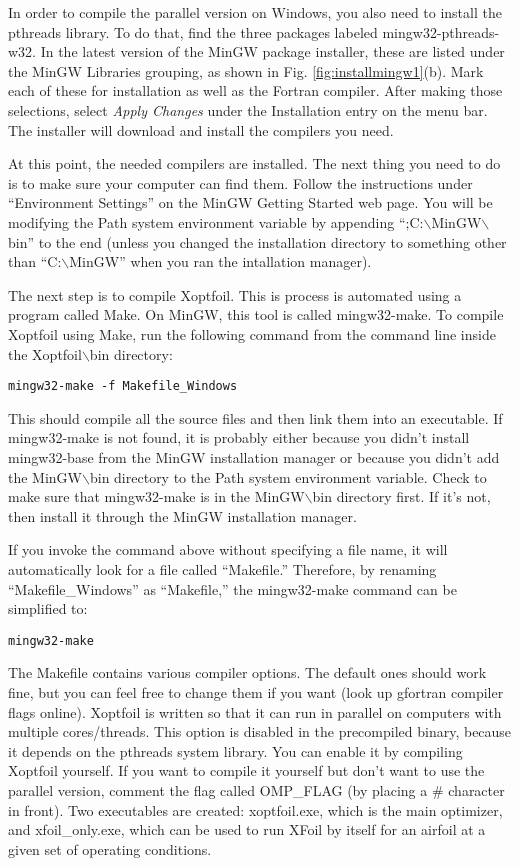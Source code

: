 \documentclass[11pt]{article}
\begin{document}
In order to compile the parallel version on Windows, you also need to install the pthreads
library.  To do that, find the three packages labeled mingw32-pthreads-w32.  In the latest
version of the MinGW package installer, these are listed under the MinGW Libraries
grouping, as shown in Fig. \ref{fig:installmingw1}(b).  Mark each of these for
installation as well as the Fortran compiler. After making those selections, select
\textit{Apply Changes} under the Installation entry on the menu bar.  The installer will 
download and install the compilers you need.

At this point, the needed compilers are installed.  The next thing you need to do is to
make sure your computer can find them.  Follow the instructions under ``Environment
Settings'' on the MinGW Getting Started web page.  You will be modifying the Path
system environment variable by appending ``;C:$\backslash$MinGW$\backslash$bin''
to the end (unless you changed the installation directory to something other than
``C:$\backslash$MinGW'' when you ran the intallation manager).

The next step is to compile Xoptfoil. This is process is automated using a program called
Make.  On MinGW, this tool is called mingw32-make.  To compile Xoptfoil using Make, run the
following command from the command line inside the Xoptfoil$\backslash$bin directory:

\begin{verbatim}
mingw32-make -f Makefile_Windows
\end{verbatim}

This should compile all the source files and then link them into an executable.  If
mingw32-make is not found, it is probably either because you didn't install mingw32-base
from the MinGW installation manager or because you didn't add the MinGW$\backslash$bin
directory to the Path system environment variable.  Check to make sure that mingw32-make
is in the MinGW$\backslash$bin directory first.  If it's not, then install it through the
MinGW installation manager.

If you invoke the command above without specifying a file name, it will automatically look
for a file called ``Makefile.''  Therefore, by renaming ``Makefile\_Windows'' as
``Makefile,'' the mingw32-make command can be simplified to:

\begin{verbatim}
mingw32-make
\end{verbatim}

The Makefile contains various compiler options.  The default ones should work fine, but
you can feel free to change them if you want (look up gfortran compiler flags online).
Xoptfoil is written so that it can run in parallel on computers with multiple
cores/threads.  This option is disabled in the precompiled binary, because it depends on
the pthreads system library.  You can enable it by compiling Xoptfoil yourself.  If you
want to compile it yourself but don't want to use the parallel version, comment the flag
called OMP\_FLAG (by placing a \# character in front). Two executables are
created: xoptfoil.exe, which is the main optimizer, and xfoil\_only.exe, which can be 
used to run XFoil by itself for an airfoil at a given set of operating conditions.
\end{document}

